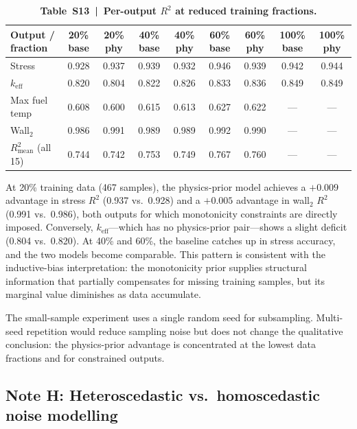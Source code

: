 \documentclass[11pt,a4paper]{article}
\newcommand{\keff}{\ensuremath{k_{\mathrm{eff}}}}
\begin{document}
\begin{table}[htbp]
\centering
\caption{\textbf{Table~S13~|~Per-output $R^2$ at reduced training fractions.}}
\label{tab:S13}
\smallskip
\small
\begin{tabular}{lcccccccc}
\toprule
Output / fraction & 20\% base & 20\% phy & 40\% base & 40\% phy & 60\% base & 60\% phy & 100\% base & 100\% phy \\
\midrule
Stress             & 0.928 & 0.937 & 0.939 & 0.932 & 0.946 & 0.939 & 0.942 & 0.944 \\
\keff{}            & 0.820 & 0.804 & 0.822 & 0.826 & 0.833 & 0.836 & 0.849 & 0.849 \\
Max fuel temp      & 0.608 & 0.600 & 0.615 & 0.613 & 0.627 & 0.622 & ---   & ---   \\
Wall$_2$           & 0.986 & 0.991 & 0.989 & 0.989 & 0.992 & 0.990 & ---   & ---   \\
$R^2_{\mathrm{mean}}$ (all 15) & 0.744 & 0.742 & 0.753 & 0.749 & 0.767 & 0.760 & --- & --- \\
\bottomrule
\end{tabular}
\end{table}

At 20\% training data (467 samples), the physics-prior model achieves a
$+0.009$ advantage in stress $R^2$ (0.937 vs.\ 0.928) and a $+0.005$
advantage in wall$_2$ $R^2$ (0.991 vs.\ 0.986), both outputs for which
monotonicity constraints are directly imposed. Conversely, \keff{}---which
has no physics-prior pair---shows a slight deficit (0.804 vs.\ 0.820).
At 40\% and 60\%, the baseline catches up in stress accuracy, and the
two models become comparable. This pattern is consistent with the
inductive-bias interpretation: the monotonicity prior supplies structural
information that partially compensates for missing training samples, but
its marginal value diminishes as data accumulate.

The small-sample experiment uses a single random seed for subsampling.
Multi-seed repetition would reduce sampling noise but does not change the
qualitative conclusion: the physics-prior advantage is concentrated at
the lowest data fractions and for constrained outputs.


\subsection{Note H: Heteroscedastic vs.\ homoscedastic noise modelling}
\label{sec:noteH}
\end{document}
